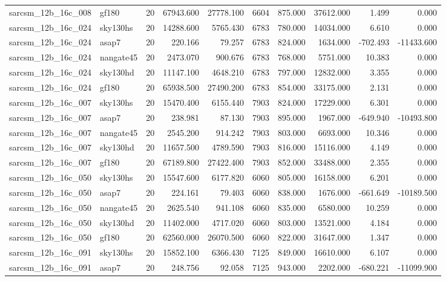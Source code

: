 \begin{tabular}{llrrrrrrrr}
sarcsm\_12b\_16c\_008 & gf180 & 20 & 67943.600 & 27778.100 & 6604 & 875.000 & 37612.000 & 1.499 & 0.000 \\
sarcsm\_12b\_16c\_024 & sky130hs & 20 & 14288.600 & 5765.430 & 6783 & 780.000 & 14034.000 & 6.610 & 0.000 \\
sarcsm\_12b\_16c\_024 & asap7 & 20 & 220.166 & 79.257 & 6783 & 824.000 & 1634.000 & -702.493 & -11433.600 \\
sarcsm\_12b\_16c\_024 & nangate45 & 20 & 2473.070 & 900.676 & 6783 & 768.000 & 5751.000 & 10.383 & 0.000 \\
sarcsm\_12b\_16c\_024 & sky130hd & 20 & 11147.100 & 4648.210 & 6783 & 797.000 & 12832.000 & 3.355 & 0.000 \\
sarcsm\_12b\_16c\_024 & gf180 & 20 & 65938.500 & 27490.200 & 6783 & 854.000 & 33175.000 & 2.131 & 0.000 \\
sarcsm\_12b\_16c\_007 & sky130hs & 20 & 15470.400 & 6155.440 & 7903 & 824.000 & 17229.000 & 6.301 & 0.000 \\
sarcsm\_12b\_16c\_007 & asap7 & 20 & 238.981 & 87.130 & 7903 & 895.000 & 1967.000 & -649.940 & -10493.800 \\
sarcsm\_12b\_16c\_007 & nangate45 & 20 & 2545.200 & 914.242 & 7903 & 803.000 & 6693.000 & 10.346 & 0.000 \\
sarcsm\_12b\_16c\_007 & sky130hd & 20 & 11657.500 & 4789.590 & 7903 & 816.000 & 15116.000 & 4.149 & 0.000 \\
sarcsm\_12b\_16c\_007 & gf180 & 20 & 67189.800 & 27422.400 & 7903 & 852.000 & 33488.000 & 2.355 & 0.000 \\
sarcsm\_12b\_16c\_050 & sky130hs & 20 & 15547.600 & 6177.820 & 6060 & 805.000 & 16158.000 & 6.201 & 0.000 \\
sarcsm\_12b\_16c\_050 & asap7 & 20 & 224.161 & 79.403 & 6060 & 838.000 & 1676.000 & -661.649 & -10189.500 \\
sarcsm\_12b\_16c\_050 & nangate45 & 20 & 2625.540 & 941.108 & 6060 & 835.000 & 6580.000 & 10.259 & 0.000 \\
sarcsm\_12b\_16c\_050 & sky130hd & 20 & 11402.000 & 4717.020 & 6060 & 803.000 & 13521.000 & 4.184 & 0.000 \\
sarcsm\_12b\_16c\_050 & gf180 & 20 & 62560.000 & 26070.500 & 6060 & 822.000 & 31647.000 & 1.347 & 0.000 \\
sarcsm\_12b\_16c\_091 & sky130hs & 20 & 15852.100 & 6366.430 & 7125 & 849.000 & 16610.000 & 6.107 & 0.000 \\
sarcsm\_12b\_16c\_091 & asap7 & 20 & 248.756 & 92.058 & 7125 & 943.000 & 2202.000 & -680.221 & -11099.900 \\

\end{tabular}

